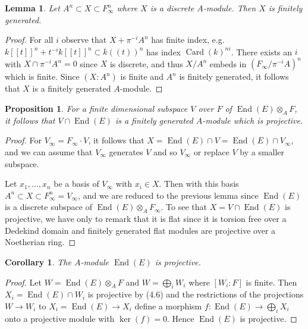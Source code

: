 \documentclass[12pt,a4paper]{article}
\theoremstyle{plain}
\newtheorem{lemma}{Lemma}[section]
\newtheorem{proposition}{Proposition}[section]
\newtheorem{corollary}{Corollary}[section]
\theoremstyle{definition}
\theoremstyle{remark}
\DeclareMathOperator{\End}{End}
\DeclareMathOperator{\Card}{Card}
\begin{document}
\begin{lemma}
Let $A^n \subset X \subset F_\infty^n$ where $X$ is a discrete $A$-module. Then 
$X$ is finitely generated.
\end{lemma}

\begin{proof}
For all $i$ observe that $X + \pi^{-i}A^n$ has finite index, e.g. 
$k[[t]]^n + t^{-i}k[[t]]^n \subset k((t))^n$ has index $\Card(k)^{ni}$. There 
exists an $i$ with $X \cap \pi^{-i}A^n = 0$ since $X$ is discrete, and thus 
$X/A^n$ embeds in $(F_\infty/\pi^{-i}A)^n$ which is finite. Since $(X : A^n)$ 
is finite and $A^n$ is finitely generated, it follows that $X$ is a finitely 
generated $A$-module.
\end{proof}

\begin{proposition}
For a finite dimensional subspace $V$ over $F$ of $\End(E) \otimes_A F$, it 
follows that $V \cap \End(E)$ is a finitely generated $A$-module which is 
projective.
\end{proposition}

\begin{proof}
For $V_\infty = F_\infty \cdot V$, it follows that $X = \End(E) \cap V = \End(E) \cap V_\infty$, and we can assume that $V_\infty$ generates $V$ and so $V_\infty$ or replace $V$ by a smaller subspace.

Let $x_1, \ldots, x_n$ be a basis of $V_\infty$ with $x_i \in X$. Then with this 
basis $A^n \subset X \subset F_\infty^n = V_\infty$, and we are reduced to the 
previous lemma since $\End(E)$ is a discrete subspace of 
$\End(E) \otimes_A F_\infty$. To see that $X = V \cap \End(E)$ is projective, 
we have only to remark that it is flat since it is torsion free over a 
Dedekind domain and finitely generated flat modules are projective over a 
Noetherian ring.
\end{proof}

\begin{corollary}
The $A$-module $\End(E)$ is projective.
\end{corollary}

\begin{proof}
Let $W = \End(E) \otimes_A F$ and $W = \bigoplus_i W_i$ where $[W_i : F]$ is 
finite. Then $X_i = \End(E) \cap W_i$ is projective by (4.6) and the 
restrictions of the projections $W \to W_i$ to $X_i = \End(E) \to X_i$ define 
a morphism $f\colon \End(E) \to \bigoplus_i X_i$ onto a projective module with 
$\ker(f) = 0$. Hence $\End(E)$ is projective.
\end{proof}
\end{document}
